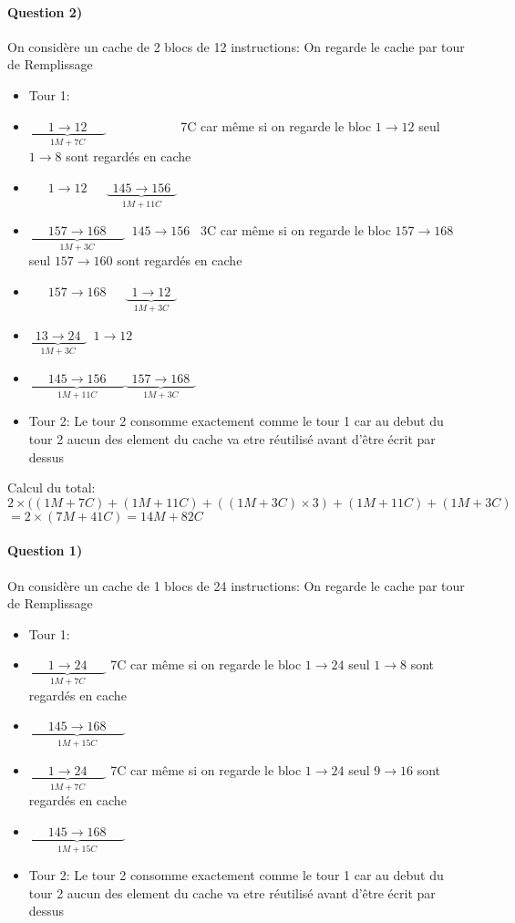 \documentclass[12pt]{report}
\begin{document}
\paragraph*{Question 2)}
On considère un cache de 2 blocs de 12 instructions:
On regarde le cache par tour de Remplissage
\begin{itemize}
\item Tour 1:
\item $\underbrace{\boxed{\phantom{555} 1 \to 12 \phantom{555}}}_{1M +7C}\boxed{\phantom{55555555555}}$  7C car même si on regarde le bloc $1 \to 12$ seul $1 \to 8$ sont regardés en cache
\item $\boxed{\phantom{555} 1 \to 12 \phantom{555}}\underbrace{\boxed{\phantom{5} 145  \to 156 \phantom{5}}}_{1M +11C}$
\item $\underbrace{\boxed{\phantom{555} 157 \to 168 \phantom{555}}}_{1M +3C}\boxed{\phantom{5} 145  \to 156 \phantom{5}}$ 3C car même si on regarde le bloc $157 \to 168$ seul $157 \to 160$ sont regardés en cache
\item $\boxed{\phantom{555} 157 \to 168 \phantom{555}}\underbrace{\boxed{\phantom{5} 1  \to 12 \phantom{5}}}_{1M +3C}$
\item $\underbrace{\boxed{\phantom{5} 13  \to 24 \phantom{5}}}_{1M +3C}\boxed{\phantom{5} 1  \to 12 \phantom{5}}$
\item $\underbrace{\boxed{\phantom{555} 145 \to 156 \phantom{555}}}_{1M +11C}\underbrace{\boxed{\phantom{5} 157  \to 168 \phantom{5}}}_{1M + 3C}$
\item Tour 2: Le tour 2 consomme exactement comme le tour 1 car au debut du tour 2 aucun des element du cache va etre réutilisé avant d'être écrit par dessus
\end{itemize}

Calcul du total: $2 \times ((1M + 7C) + (1M +11C) + ((1M +3C) \times 3) + (1M + 11C) + (1M +3C)$ \\
$=2 \times  (7M +  41C) = 14M + 82C$

\paragraph*{Question 1)}
On considère un cache de 1 blocs de 24 instructions:
On regarde le cache par tour de Remplissage
\begin{itemize}
\item Tour 1:
\item $\underbrace{\boxed{\phantom{555} 1 \to 24 \phantom{555}}}_{1M +7C}$ 7C car même si on regarde le bloc $1 \to 24$ seul $1 \to 8$ sont regardés en cache
\item $\underbrace{\boxed{\phantom{555} 145 \to 168 \phantom{555}}}_{1M +15C}$
\item $\underbrace{\boxed{\phantom{555} 1 \to 24 \phantom{555}}}_{1M +7C}$ 7C car même si on regarde le bloc $1 \to 24$ seul $9 \to 16$ sont regardés en cache
\item $\underbrace{\boxed{\phantom{555} 145 \to 168 \phantom{555}}}_{1M +15C}$
\item Tour 2: Le tour 2 consomme exactement comme le tour 1 car au debut du tour 2 aucun des element du cache va etre réutilisé avant d'être écrit par dessus
\end{itemize}
\end{document}
